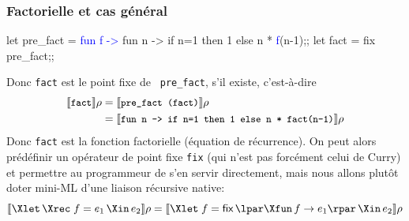 %
\begin{frame}[containsverbatim]
\frametitle{Factorielle et cas général}

{\small
\begin{semiverbatim}
let pre_fact =
  \textcolor{blue}{fun f ->} fun n -> if n=1 then 1 else n * \textcolor{blue}{f}(n-1);;
let fact = fix pre_fact;;
\end{semiverbatim}
}
Donc \texttt{\small fact} est le point fixe de \texttt{\small
pre\_fact}, s'il existe, c'est-à-dire
\begin{align*}
\llbracket{\texttt{\small fact}}\rrbracket{\rho} &= \llbracket{\texttt{\small pre\_fact
    (fact)}}\rrbracket{\rho}\\
&= \llbracket{\texttt{\small fun n -> if n=1 then 1 else n * fact(n-1)}}\rrbracket{\rho}
\end{align*}
Donc \texttt{\small fact} est la fonction factorielle (équation de
récurrence). On peut alors prédéfinir un opérateur de point fixe
\texttt{\small fix} (qui n'est pas forcément celui de Curry) et
permettre au programmeur de s'en servir directement, mais nous allons
plutôt doter mini-ML d'une liaison récursive native:
$$\evalf{\Xlet \, \Xrec \; f = e_1 \, \Xin \, e_2}{\rho} =
\evalf{\Xlet \; f = \textsf{fix} \, \lpar\Xfun \, f \rightarrow
e_1\rpar \, \Xin \, e_2}{\rho}$$

\end{frame}
